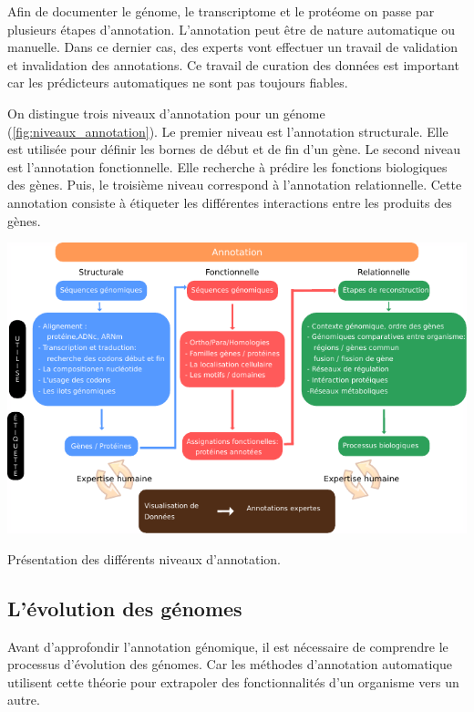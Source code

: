 \begin{refsegment}
    Afin de documenter le génome, le transcriptome et le protéome on passe par plusieurs étapes d’annotation. L’annotation peut être de nature automatique ou manuelle. Dans ce dernier cas, des experts vont effectuer un travail de validation et invalidation des annotations. Ce travail de curation des données est important car les prédicteurs automatiques ne sont pas toujours fiables.
    
    On distingue trois niveaux d’annotation pour un génome (\cref{fig:niveaux_annotation}). Le premier niveau est l’annotation structurale. Elle est utilisée pour définir les bornes de début et de fin d’un gène.  Le second niveau est l’annotation fonctionnelle. Elle recherche à prédire les fonctions biologiques des gènes. Puis, le troisième niveau correspond à l’annotation relationnelle. Cette annotation consiste à étiqueter les différentes interactions entre les produits des gènes.
    
    \begin{shadedfigure}[H]
        \centering
        \includegraphics[width=\textwidth]{img/niveaux_annotations.pdf}
        \caption{Présentation des différents niveaux d’annotation.}
        \label{fig:niveaux_annotation}
    \end{shadedfigure}
    
    \subsection{L’évolution des génomes}
    Avant d'approfondir l’annotation génomique, il est nécessaire de comprendre le processus d’évolution des génomes. Car les méthodes d’annotation automatique utilisent cette théorie pour extrapoler des fonctionnalités d’un organisme vers un autre.
    

\end{refsegment}
